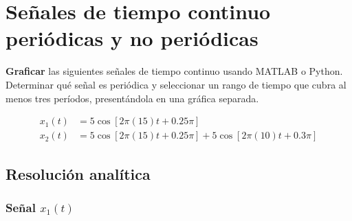\documentclass[../Main_Include.tex]{subfiles}
\begin{document}
%
%
%
%

\newcommand{\tituloinforme}{Digitalización de Señales — Laboratorio 1}

\section{Señales de tiempo continuo periódicas y no periódicas}

\textbf{Graficar} las siguientes señales de tiempo continuo usando MATLAB o Python.
Determinar qué señal es periódica y seleccionar un rango de tiempo que cubra
al menos tres períodos, presentándola en una gráfica separada.

\begin{align}
    x_1(t) &= 5\cos\!\left[2\pi(15)t + 0.25\pi\right] \\[6pt]
    x_2(t) &= 5\cos\!\left[2\pi(15)t + 0.25\pi\right]
             + 5\cos\!\left[2\pi(10)t + 0.3\pi\right]
\end{align}

\subsection*{Resolución analítica}

\subsubsection*{Señal \boldmath$x_1(t)$}
\end{document}
